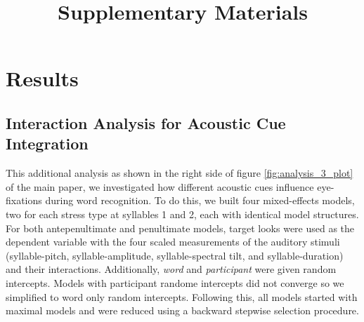 \documentclass[sn-apa]{sn-jnl} %
\begin{document}
\title[Supplementary Materials]{Supplementary Materials}

\maketitle

\section{Results}

\subsection{Interaction Analysis for Acoustic Cue Integration}

This additional analysis as shown in the right side of figure \ref{fig:analysis_3_plot} of the main paper, we investigated how different acoustic cues influence eye-fixations during word recognition. To do this, we built four mixed-effects models, two for each stress type at syllables 1 and 2, each with identical model structures. For both antepenultimate and penultimate models, target looks were used as the dependent variable with the four scaled measurements of the auditory stimuli (syllable-pitch, syllable-amplitude, syllable-spectral tilt, and syllable-duration) and their interactions. Additionally, \textit{word} and \textit{participant} were given random intercepts. Models with participant randome intercepts did not converge so we simplified to word only random intercepts. Following this, all models started with maximal models and were reduced using a backward stepwise selection procedure. 
\end{document}
